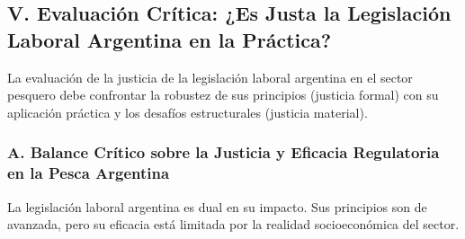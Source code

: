 \documentclass[]{article}
\begin{document}
\hypertarget{v.-evaluaciuxf3n-cruxedtica-es-justa-la-legislaciuxf3n-laboral-argentina-en-la-pruxe1ctica}{%
\subsection{V. Evaluación Crítica: ¿Es Justa la Legislación Laboral
Argentina en la
Práctica?}\label{v.-evaluaciuxf3n-cruxedtica-es-justa-la-legislaciuxf3n-laboral-argentina-en-la-pruxe1ctica}}

La evaluación de la justicia de la legislación laboral argentina en el
sector pesquero debe confrontar la robustez de sus principios (justicia
formal) con su aplicación práctica y los desafíos estructurales
(justicia material).

\hypertarget{a.-balance-cruxedtico-sobre-la-justicia-y-eficacia-regulatoria-en-la-pesca-argentina}{%
\subsubsection{A. Balance Crítico sobre la Justicia y Eficacia
Regulatoria en la Pesca
Argentina}\label{a.-balance-cruxedtico-sobre-la-justicia-y-eficacia-regulatoria-en-la-pesca-argentina}}

La legislación laboral argentina es dual en su impacto. Sus principios
son de avanzada, pero su eficacia está limitada por la realidad
socioeconómica del sector.
\end{document}

